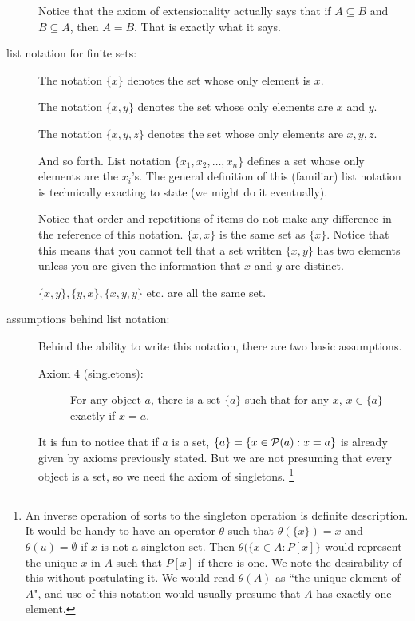 \documentclass[12pt]{article}
\begin{document}
\begin{description}
\begin{description}
\end{description}

Notice that the axiom of extensionality actually says that if $A \subseteq B$ and $B \subseteq A$, then $A = B$.   That is exactly what it says.


\item[list notation for finite sets:]  The notation $\{x\}$ denotes the set whose only element is $x$.

The notation $\{x,y\}$ denotes the set whose only elements are $x$ and $y$.

The notation $\{x,y,z\}$ denotes the set whose only elements are $x,y,z$.

And so forth.  List notation $\{x_1,x_2,\ldots,x_n\}$ defines a set whose only elements are the $x_i$'s.
The general definition of this (familiar) list notation is technically exacting to state (we might do it eventually).

Notice that order and repetitions of items do not make any difference in the reference of this notation.
$\{x,x\}$ is the same set as $\{x\}$.  Notice that this means that you cannot tell that a set written $\{x,y\}$ has two elements unless you are given the information that $x$ and $y$ are distinct.

$\{x,y\}, \{y,x\}, \{x,y,y\}$ etc. are all the same set.

\item[assumptions behind list notation:]

Behind the ability to write this notation, there are two basic assumptions.

\begin{description}

\item[Axiom 4 (singletons):]  For any object $a$, there is a set $\{a\}$ such that for any $x$, $x \in \{a\}$ exactly if $x=a$.

\end{description}

It is fun to notice that if $a$ is a set, $\{a\} = \{x \in {\cal P}(a):x=a\}$ is already given by axioms previously stated.
But we are not presuming that every object is a set, so we need the axiom of singletons. \footnote{An inverse operation of sorts to the singleton operation is definite description.  It would be handy to have an operator
$\theta$ such that $\theta(\{x\}) = x$ and $\theta(u) = \emptyset$ if $x$ is not a singleton set.  Then $\theta(\{x \in A:P[x]\}$ would represent the unique $x$ in $A$ such that $P[x]$ if there is one.   We note the desirability of this without postulating it.  We would read $\theta(A)$ as ``the unique element of $A$", and use of this notation would usually presume
that $A$ has exactly one element.}


\end{description}
\end{document}
